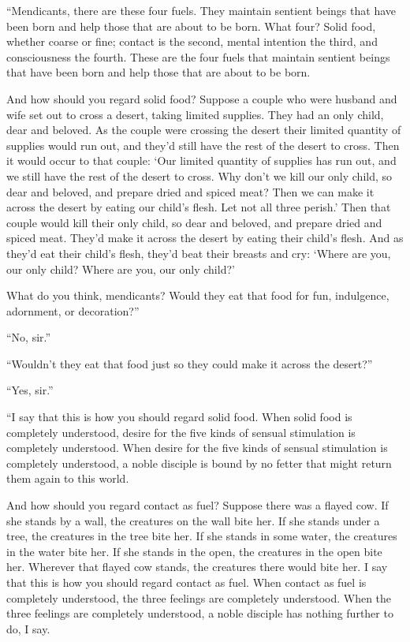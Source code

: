 \documentclass[12pt,openany]{book}%
\begin{document}
“Mendicants, there are these four fuels. They maintain sentient beings that have been born and help those that are about to be born. What four? Solid food, whether coarse or fine; contact is the second, mental intention the third, and consciousness the fourth. These are the four fuels that maintain sentient beings that have been born and help those that are about to be born. 

And how should you regard solid food? Suppose a couple who were husband and wife set out to cross a desert, taking limited supplies. They had an only child, dear and beloved. As the couple were crossing the desert their limited quantity of supplies would run out, and they’d still have the rest of the desert to cross. Then it would occur to that couple: ‘Our limited quantity of supplies has run out, and we still have the rest of the desert to cross. Why don’t we kill our only child, so dear and beloved, and prepare dried and spiced meat? Then we can make it across the desert by eating our child’s flesh. Let not all three perish.’ Then that couple would kill their only child, so dear and beloved, and prepare dried and spiced meat. They’d make it across the desert by eating their child’s flesh. And as they’d eat their child’s flesh, they’d beat their breasts and cry: ‘Where are you, our only child? Where are you, our only child?’ 

What do you think, mendicants? Would they eat that food for fun, indulgence, adornment, or decoration?” 

“No, sir.” 

“Wouldn’t they eat that food just so they could make it across the desert?” 

“Yes, sir.” 

“I say that this is how you should regard solid food. When solid food is completely understood, desire for the five kinds of sensual stimulation is completely understood. When desire for the five kinds of sensual stimulation is completely understood, a noble disciple is bound by no fetter that might return them again to this world. 

And how should you regard contact as fuel? Suppose there was a flayed cow. If she stands by a wall, the creatures on the wall bite her. If she stands under a tree, the creatures in the tree bite her. If she stands in some water, the creatures in the water bite her. If she stands in the open, the creatures in the open bite her. Wherever that flayed cow stands, the creatures there would bite her. I say that this is how you should regard contact as fuel. When contact as fuel is completely understood, the three feelings are completely understood. When the three feelings are completely understood, a noble disciple has nothing further to do, I say. 
\end{document}
